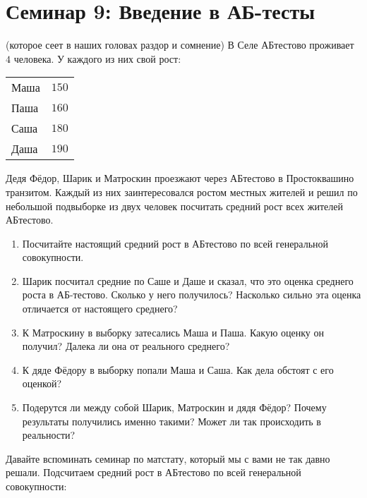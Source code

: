 \documentclass[12pt, a4paper, oneside]{article}
\theoremstyle{plain} %
\theoremstyle{definition}
\begin{document}

\toggletrue{lecture}


\section*{Семинар 9: Введение в АБ-тесты }

\begin{problem}{(которое сеет в наших головах раздор и сомнение)}
В Селе  АБтестово проживает $4$ человека. У каждого из них свой рост:

\begin{center}
	\begin{tabular}{lc}
		\toprule
		Маша &  $150$\\
		Паша &  $160$\\
		Саша &  $180$\\
		Даша &  $190$\\ 
		\bottomrule
	\end{tabular}	
\end{center}

Дедя Фёдор, Шарик и Матроскин проезжают через АБтестово в Простоквашино транзитом. Каждый из них заинтересовался ростом местных жителей и решил по небольшой подвыборке из двух человек посчитать средний рост всех жителей АБтестово. 

\begin{enumerate} 
	\item[а)] Посчитайте настоящий средний рост в АБтестово по всей генеральной совокупности.
	\item[б)] Шарик посчитал средние по Саше и Даше и сказал, что это оценка среднего роста в АБ-тестово. Сколько у него получилось? Насколько сильно эта оценка отличается от настоящего среднего? 
	\item[в)] К Матроскину в выборку затесались Маша и Паша. Какую оценку он получил? Далека ли она от реального среднего? 
	\item[г)] К дяде Фёдору в выборку попали Маша и Саша. Как дела обстоят с его оценкой? 
	\item[д)] Подерутся ли между собой Шарик, Матроскин и дядя Фёдор? Почему результаты получились именно такими? Может ли так происходить в реальности? 
\end{enumerate} 

\begin{solution}
Давайте вспоминать семинар по матстату, который мы с вами не так давно решали. Подсчитаем средний рост в АБтестово  по всей генеральной совокупности: 


\end{solution}
\end{problem}
\end{document}
